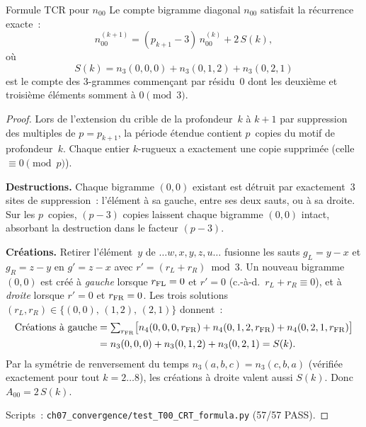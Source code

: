 \documentclass[12pt,a4paper]{article}
\begin{document}
\begin{thmbox}{Formule TCR pour $n_{00}$}
\label{thm:n00_CRT}
Le compte bigramme diagonal $n_{00}$ satisfait la récurrence
exacte~:
\begin{equation}
  n_{00}^{(k+1)} = (p_{k+1} - 3)\,n_{00}^{(k)} + 2\,S(k),
  \label{eq:n00_CRT}
\end{equation}
où
\begin{equation}
  S(k) = n_3(0,0,0) + n_3(0,1,2) + n_3(0,2,1)
  \label{eq:S_def}
\end{equation}
est le compte des 3-grammes commençant par résidu~$0$ dont les
deuxième et troisième éléments somment à $0\!\pmod{3}$.

\begin{proof}
Lors de l'extension du crible de la profondeur~$k$ à $k{+}1$ par
suppression des multiples de $p = p_{k+1}$, la période étendue
contient $p$~copies du motif de profondeur~$k$. Chaque entier
$k$-rugueux a exactement une copie supprimée (celle
$\equiv 0\!\pmod{p}$).

\textbf{Destructions.} Chaque bigramme $(0,0)$ existant est détruit par
exactement~$3$ sites de suppression~: l'élément à sa gauche, entre
ses deux sauts, ou à sa droite. Sur les $p$~copies, $(p{-}3)$ copies
laissent chaque bigramme $(0,0)$ intact, absorbant la destruction
dans le facteur $(p{-}3)$.

\textbf{Créations.} Retirer l'élément~$y$ de
$\ldots w,x,y,z,u\ldots$ fusionne les sauts $g_L = y{-}x$ et
$g_R = z{-}y$ en $g' = z{-}x$ avec $r' = (r_L + r_R)\!\bmod{3}$. Un
nouveau bigramme $(0,0)$ est créé à \emph{gauche} lorsque
$r_{\rm FL} = 0$ et $r' = 0$ (c.-à-d.\ $r_L + r_R \equiv 0$), et à
\emph{droite} lorsque $r' = 0$ et $r_{\rm FR} = 0$. Les trois
solutions $(r_L, r_R) \in \{(0,0),\,(1,2),\,(2,1)\}$ donnent~:
\begin{align}
  \text{Créations à gauche} &= \textstyle\sum_{r_{\rm FR}}
    \bigl[n_4(0,0,0,r_{\rm FR}) + n_4(0,1,2,r_{\rm FR})
    + n_4(0,2,1,r_{\rm FR})\bigr] \notag\\
  &= n_3(0,0,0) + n_3(0,1,2) + n_3(0,2,1) = S(k).
\end{align}
Par la symétrie de renversement du temps
$n_3(a,b,c) = n_3(c,b,a)$ (vérifiée exactement pour tout
$k = 2\ldots 8$), les créations à droite valent aussi $S(k)$. Donc
$A_{00} = 2\,S(k)$.

Scripts~: \texttt{ch07\_convergence/test\_T00\_CRT\_formula.py}
(57/57 PASS).
\end{proof}
\end{thmbox}
\end{document}

